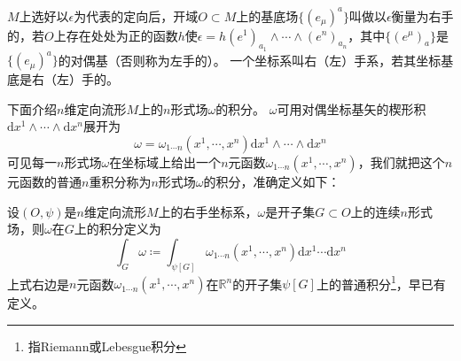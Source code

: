 \begin{definition}
    $M$上选好以$\epsilon$为代表的定向后，开域$O \subset M$上的基底场$\{(e_\mu)^a\}$叫做以$\epsilon$衡量为右手的，若$O$上存在处处为正的函数$h$使$\epsilon = h(e^1)_{a_1} \wedge \cdots \wedge (e^n)_{a_n}$，其中$\{(e^\mu)_a\}$是$\{(e_\mu)^a\}$的对偶基（否则称为左手的）。
    一个坐标系叫右（左）手系，若其坐标基底是右（左）手的。
\end{definition}

下面介绍$n$维定向流形$M$上的$n$形式场$\omega$的积分。
$\omega$可用对偶坐标基矢的楔形积$\mathrm{d}x^1 \wedge \cdots \wedge \mathrm{d}x^n$展开为
$$\omega = \omega_{1 \cdots n}(x^1, \cdots, x^n)\mathrm{d}x^1 \wedge \cdots \wedge \mathrm{d}x^n$$
可见每一$n$形式场$\omega$在坐标域上给出一个$n$元函数$\omega_{1 \cdots n}(x^1, \cdots, x^n)$，我们就把这个$n$元函数的普通$n$重积分称为$n$形式场$\omega$的积分，准确定义如下：

\begin{definition}
    设$(O, \psi)$是$n$维定向流形$M$上的右手坐标系，$\omega$是开子集$G \subset O$上的连续$n$形式场，则$\omega$在$G$上的积分定义为
    $$\int_G\omega \coloneq \int_{\psi[G]}\omega_{1 \cdots n}(x^1, \cdots, x^n)\mathrm{d}x^1 \cdots \mathrm{d}x^n$$
    上式右边是$n$元函数$\omega_{1 \cdots n}(x^1, \cdots, x^n)$在$\mathbb{R}^n$的开子集$\psi[G]$上的普通积分\footnote{指Riemann或Lebesgue积分}，早已有定义。
\end{definition}

